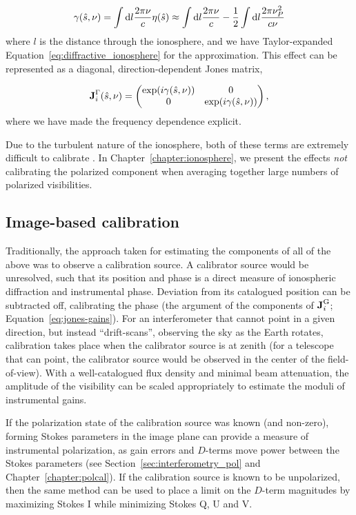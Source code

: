 \begin{equation}
\gamma(\hat{s},\nu) = \int {\rm d}l \frac{2\pi\nu}{c}\eta(\hat{s}) \approx \int {\rm d}l \frac{2\pi\nu}{c} - \frac{1}{2}\int {\rm d}l \frac{2\pi\nu_P^2}{c\nu}
\end{equation}
where $l$ is the distance through the ionosphere, and we have Taylor-expanded Equation~\ref{eq:diffractive_ionosphere} for the approximation. This effect can be represented as a diagonal, direction-dependent Jones matrix,

\begin{equation}
\textbf{J}_i^{\rm \Gamma}(\hat{s},\nu) = 
\begin{pmatrix}
\exp(i\gamma(\hat{s},\nu)) &0 \\
0 & \exp(i\gamma(\hat{s},\nu))\\
\end{pmatrix},
\end{equation}
where we have made the frequency dependence explicit.

Due to the turbulent nature of the ionosphere, both of these terms are extremely difficult to calibrate \citep{Intema.09, Vedantham.15}. In Chapter~\ref{chapter:ionosphere}, we present the effects \textit{not} calibrating the polarized component when averaging together large numbers of polarized visibilities.

\subsection{Image-based calibration}

Traditionally, the approach taken for estimating the components of all of the above was to observe a calibration source. A calibrator source would be unresolved, such that its position and phase is a direct measure of ionospheric diffraction and instrumental phase. Deviation from its catalogued position can be subtracted off, calibrating the phase (the argument of the components of $\textbf{J}_i^{\rm G}$; Equation~\ref{eq:jones-gains}). For an interferometer that cannot point in a given direction, but instead ``drift-scans'', observing the sky as the Earth rotates, calibration takes place when the calibrator source is at zenith (for a telescope that can point, the calibrator source would be observed in the center of the field-of-view). With a well-catalogued flux density and minimal beam attenuation, the amplitude of the visibility can be scaled appropriately to estimate the moduli of instrumental gains.

If the polarization state of the calibration source was known (and non-zero), forming Stokes parameters in the image plane can provide a measure of instrumental polarization, as gain errors and $D$-terms move power between the Stokes parameters (see Section~\ref{sec:interferometry_pol} and Chapter~\ref{chapter:polcal}). If the calibration source is known to be unpolarized, then the same method can be used to place a limit on the $D$-term magnitudes by maximizing Stokes I while minimizing Stokes Q, U and V.


